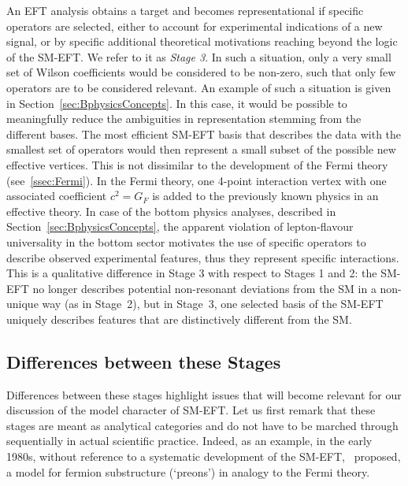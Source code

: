 An EFT analysis obtains a target and becomes representational if specific operators are selected, either to account for experimental indications of a new signal, or by specific additional theoretical motivations reaching beyond the logic of the SM-EFT. 
We refer to it as \emph{Stage 3}.  
In such a situation, only a very small set of Wilson coefficients would be considered to be non-zero, such that only few operators are to be considered relevant.
An example of such a situation is given in Section~\ref{sec:BphysicsConcepts}.
In this case, it would be possible to meaningfully reduce the
ambiguities in representation stemming from the different bases. 
The most efficient SM-EFT basis that describes the data with the
smallest set of operators would then represent a small subset of the
possible new effective vertices.  
This is not dissimilar to the
development of the Fermi theory (see~\ref{ssec:Fermi}). 
In the Fermi
theory, one 4-point interaction vertex with one associated coefficient
$c^2=G_F$ is added to the previously known physics in an effective
theory. 
In case of the bottom physics analyses, described in Section~\ref{sec:BphysicsConcepts}, the apparent violation of lepton-flavour universality in the bottom sector motivates the use of specific operators to describe observed experimental features, thus they represent specific interactions. 
This is a qualitative difference in Stage 3 with respect to Stages 1 and 2: the SM-EFT no longer describes potential non-resonant deviations from the SM in a non-unique way (as in Stage~2), but in Stage~3, one selected basis of the SM-EFT uniquely describes features that are distinctively different from the SM.

\subsection{Differences between these Stages}

Differences between these stages highlight issues that will become
relevant for our discussion of the model character of SM-EFT.
Let us first remark that these stages are meant as analytical categories and do not have to be marched through sequentially in actual scientific practice.
Indeed, as an example, in the early 1980s, without reference to
a systematic development of the SM-EFT,~\cite{Eichten:1983hw} proposed,
a model for fermion substructure (`preons') in analogy to the Fermi theory.

